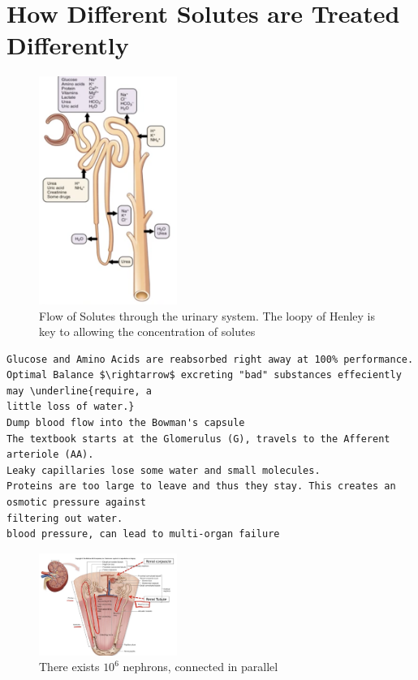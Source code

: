 \documentclass{report}
\begin{document}
\section{How Different Solutes are Treated Differently}
\begin{figure}[htbp]
  \centering
  \includegraphics[width=0.4\textwidth]{img4.png}
  \caption{Flow of Solutes through the urinary system. The loopy of Henley is key to allowing the concentration of solutes}
\end{figure}
\begin{verbatim}
Glucose and Amino Acids are reabsorbed right away at 100% performance. 
Optimal Balance $\rightarrow$ excreting "bad" substances effeciently may \underline{require, a 
little loss of water.}
Dump blood flow into the Bowman's capsule
The textbook starts at the Glomerulus (G), travels to the Afferent arteriole (AA).
Leaky capillaries lose some water and small molecules. 
Proteins are too large to leave and thus they stay. This creates an osmotic pressure against 
filtering out water.
blood pressure, can lead to multi-organ failure
\end{verbatim}
\begin{figure}[htbp]
  \centering
  \includegraphics[width=0.4\textwidth]{img5.png}
  \caption{There exists $10^6$ nephrons, connected in parallel}
\end{figure}
\end{document}

